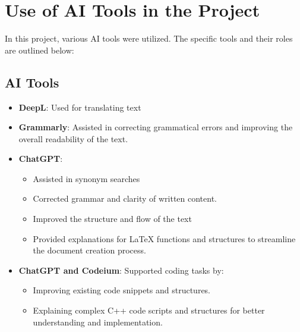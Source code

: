 \chapter{Use of AI Tools in the Project}
In this project, various AI tools were utilized. The specific tools and their roles are outlined below:

\section*{AI Tools}
\begin{itemize}
    \item \textbf{DeepL}: Used for translating text
    \item \textbf{Grammarly}: Assisted in correcting grammatical errors and improving the overall readability of the text.
    \item \textbf{ChatGPT}:
    \begin{itemize}
        \item Assisted in synonym searches
        \item Corrected grammar and clarity of written content.
        \item Improved the structure and flow of the text
        \item Provided explanations for LaTeX functions and structures to streamline the document creation process.
    \end{itemize}
    \item \textbf{ChatGPT and Codeium}: Supported coding tasks by:
    \begin{itemize}
        \item Improving existing code snippets and structures.
        \item Explaining complex C++ code scripts and structures for better understanding and implementation.
    \end{itemize}
\end{itemize}